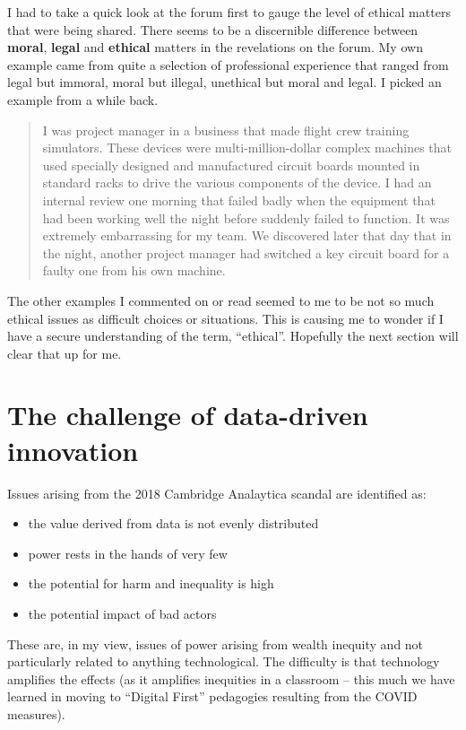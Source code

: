\documentclass[
]{book}
\providecommand{\tightlist}{%
  \setlength{\itemsep}{0pt}\setlength{\parskip}{0pt}}
\begin{document}
I had to take a quick look at the forum first to gauge the level of ethical matters that were being shared. There seems to be a discernible difference between \textbf{moral}, \textbf{legal} and \textbf{ethical} matters in the revelations on the forum. My own example came from quite a selection of professional experience that ranged from legal but immoral, moral but illegal, unethical but moral and legal. I picked an example from a while back.

\begin{quote}
I was project manager in a business that made flight crew training simulators. These devices were multi-million-dollar complex machines that used specially designed and manufactured circuit boards mounted in standard racks to drive the various components of the device. I had an internal review one morning that failed badly when the equipment that had been working well the night before suddenly failed to function. It was extremely embarrassing for my team. We discovered later that day that in the night, another project manager had switched a key circuit board for a faulty one from his own machine.
\end{quote}

The other examples I commented on or read seemed to me to be not so much ethical issues as difficult choices or situations. This is causing me to wonder if I have a secure understanding of the term, ``ethical''. Hopefully the next section will clear that up for me.

\hypertarget{the-challenge-of-data-driven-innovation}{%
\section{The challenge of data-driven innovation}\label{the-challenge-of-data-driven-innovation}}

Issues arising from the 2018 Cambridge Analaytica scandal are identified as:

\begin{itemize}
\tightlist
\item
  the value derived from data is not evenly distributed
\item
  power rests in the hands of very few
\item
  the potential for harm and inequality is high
\item
  the potential impact of bad actors
\end{itemize}

These are, in my view, issues of power arising from wealth inequity and not particularly related to anything technological. The difficulty is that technology amplifies the effects (as it amplifies inequities in a classroom -- this much we have learned in moving to ``Digital First'' pedagogies resulting from the COVID measures).
\end{document}
